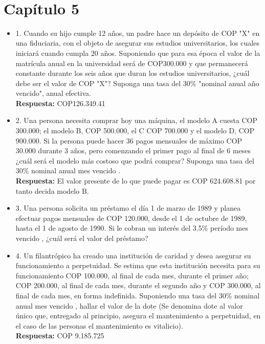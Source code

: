 \begin{itemize}
\end{itemize}\
\newpage


\chapter*{Capítulo 5}



\begin{itemize}

 \item 1. Cuando su hijo cumple 12 años, un padre hace un depósito de  COP  "X" en una fiduciaria, con el objeto de asegurar sus estudios universitarios, los cuales iniciará cuando cumpla 20 años. Suponiendo que para esa época el valor de la matrícula anual en la universidad será de COP300.000 y que permanecerá constante durante los seis años que duran los estudios universitarios, ¿cuál debe ser el valor de  COP  "X"? Suponga una tasa del 30\% "nominal anual año vencido", anual efectiva.\\
       \textbf{Respuesta:} COP126.349.41\\
       \medskip

 \item 2. Una persona necesita comprar hoy una máquina, el modelo A cuesta COP 300.000; el modelo B, COP 500.000, el C COP 700.000 y el modelo D, COP 900.000. Si la persona puede hacer 36 pagos mensuales de máximo COP 30.000 durante 3 años, pero comenzando el primer pago al final de 6 meses ¿cuál será el modelo más costoso que podrá comprar? Suponga una tasa del 30\% nominal anual mes vencido .\\
       \textbf{Respuesta:} El valor presente de lo que puede pagar es COP 624.608.81 por tanto decida modelo B.\\
       \medskip

 \item 3. Una persona solicita un préstamo el día 1 de marzo de 1989 y planea efectuar pagos mensuales de COP 120.000, desde el 1 de octubre de 1989, hasta el 1 de agosto de 1990. Si le cobran un interés del 3.5\% período mes vencido , ¿cuál será el valor del préstamo?\\
       \medskip

 \item 4. Un filantrópico ha creado una institución de caridad y desea asegurar su funcionamiento a perpetuidad. Se estima que esta institución necesita para su funcionamiento COP 100.000, al final de cada mes, durante el primer año; COP 200.000, al final de cada mes, durante el segundo año y COP 300.000, al final de cada mes, en forma indefinida. Suponiendo una tasa del 30\% nominal anual mes vencido , hallar el valor de la dote (Se denomina dote al valor único que, entregado al principio, asegura el mantenimiento a perpetuidad, en el caso de las personas el mantenimiento es vitalicio).\\
       \textbf{Respuesta:} COP 9.185.725\\
       \medskip


\end{itemize}
